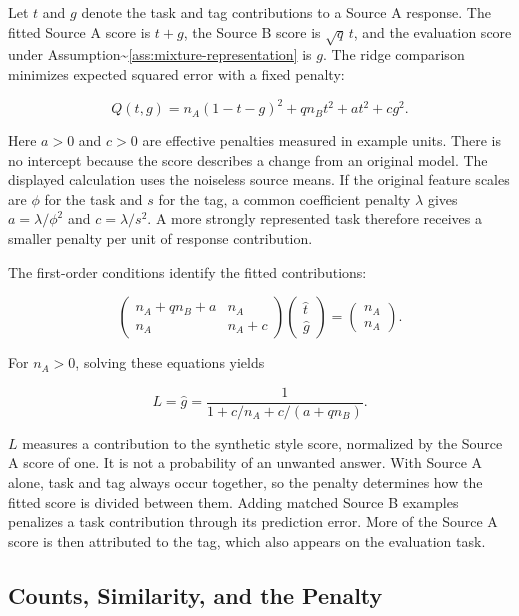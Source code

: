 Let \(t\) and \(g\) denote the task and tag contributions to a Source A
response. The fitted Source A score is \(t+g\), the Source B score is
\(\sqrt q\,t\), and the evaluation score under
Assumption\textasciitilde{}\ref{ass:mixture-representation} is \(g\).
The ridge comparison minimizes expected squared error with a fixed
penalty:

\[
Q(t,g)=n_A(1-t-g)^2+q n_Bt^2+a t^2+c g^2.
\]

Here \(a>0\) and \(c>0\) are effective penalties measured in example
units. There is no intercept because the score describes a change from
an original model. The displayed calculation uses the noiseless source
means. If the original feature scales are \(\phi\) for the task and
\(s\) for the tag, a common coefficient penalty \(\lambda\) gives
\(a=\lambda/\phi^2\) and \(c=\lambda/s^2\). A more strongly represented
task therefore receives a smaller penalty per unit of response
contribution.


The first-order conditions identify the fitted contributions:

\[
\begin{pmatrix}
n_A+q n_B+a & n_A\\
n_A & n_A+c
\end{pmatrix}
\begin{pmatrix}\widehat t\\\widehat g\end{pmatrix}
=\begin{pmatrix}n_A\\n_A\end{pmatrix}.
\]

For \(n_A>0\), solving these equations yields

\[
L=\widehat g=\frac{1}{1+c/n_A+c/(a+q n_B)}.
\]

\(L\) measures a contribution to the synthetic style score, normalized
by the Source A score of one. It is not a probability of an unwanted
answer. With Source A alone, task and tag always occur together, so the
penalty determines how the fitted score is divided between them. Adding
matched Source B examples penalizes a task contribution through its
prediction error. More of the Source A score is then attributed to the
tag, which also appears on the evaluation task.

\hypertarget{M07-counts-similarity-and-the-penalty}{%
\subsection{Counts, Similarity, and the
Penalty}\label{M07-counts-similarity-and-the-penalty}}

